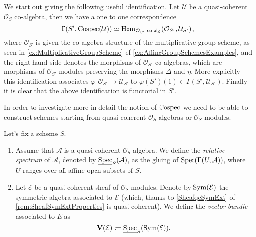 \begin{rem}[]\label{rem:CospecSections}
	We start out giving the following useful identification.
	Let $\mathcal{U}$ be a quasi-coherent $\mathcal{O}_{ S }$ co-algebra,
	then we have a one to one correspondence
	\begin{equation*}
	\Gamma(S', \operatorname{Cospec}(\mathcal{U})) \simeq
	\operatorname{Hom}_{ \mathcal{O}_{ S' }\text{-}\mathsf{co}\text{-}\mathsf{alg}} 
	\left( \mathcal{O}_{ S' }, \mathcal{U}_{S'} \right)
	,\end{equation*}
	where $\mathcal{O}_{ S' }$ is given the co-algebra structure 
	of the multiplicative group scheme, as seen in
	\cref{ex:MultiplicativeGroupScheme} of \cref{ex:AffineGroupSchemesExamples},
	and the right hand side denotes the morphisms of 
	$\mathcal{O}_{ S' }$-co-algebras, which are
	morphisms of \(\mathcal{O}_{ S' }\)-modules
	preserving the morphisms $\Delta$ and \(\eta\).
	More explicitly this identification associates
	$\varphi\colon \mathcal{O}_{ S' } \to \mathcal{U}_{S'}$ to
	$\varphi(S')(1) \in \Gamma(S', \mathcal{U}_{S'})$.
	Finally it is clear that the above identification is functorial in $S'$.
\end{rem}


\noindent
In order to investigate more in detail the notion of $\operatorname{Cospec}$ we need to 
be able to construct schemes starting from quasi-coherent $\mathcal{O}_{ S }$-algebras
or $\mathcal{O}_{ S }$-modules.


\begin{defn}
	Let's fix a scheme $S$.
\begin{enumerate}
	\item Assume that $\mathcal{A}$ is a quasi-coherent $\mathcal{O}_{ S }$-algebra.
		We define the \emph{relative spectrum} of $\mathcal{A}$, denoted by
		$\underline{\operatorname{Spec}}_S(\mathcal{A})$, as the gluing of
		$\operatorname{Spec}(\Gamma(U, \mathcal{A}))$, where $U$ ranges
		over all affine open subsets of $S$.

	\item  Let $\mathcal{E}$ be a quasi-coherent sheaf of $\mathcal{O}_{ S }$-modules.
		Denote by $\operatorname{Sym}(\mathcal{E})$ the symmetric algebra associated to 
		$\mathcal{E}$ (which, thanks to \cref{SheafqcSymExt} of
		\cref{rem:SheafSymExtProperties} is quasi-coherent).
		We define the \emph{vector bundle} associated to $E$ as
		\begin{equation*}
			\mathbf{V}(\mathcal{E}) \coloneqq
			\underline{\operatorname{Spec}}_S (\operatorname{Sym}(\mathcal{E}))
		.\end{equation*}
\end{enumerate}
\end{defn}


